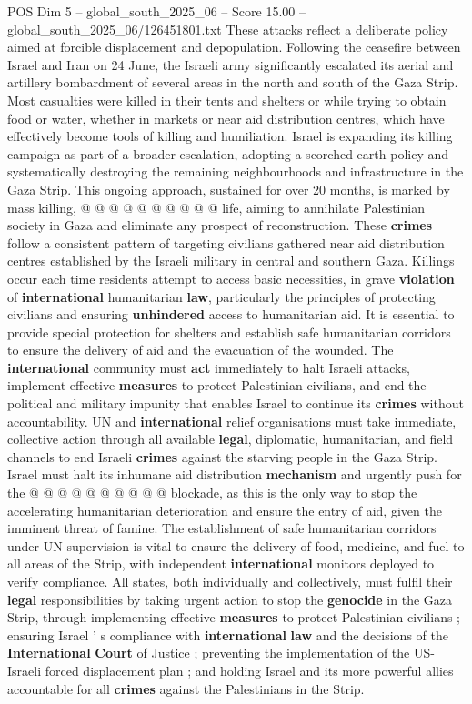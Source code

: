 \begin{textsample}{POS Dim 5 – global\_south\_2025\_06 – Score 15.00 – global\_south\_2025\_06/126451801.txt}
These attacks reflect a deliberate policy aimed at forcible displacement and depopulation.
Following the ceasefire between Israel and Iran on 24 June, the Israeli army significantly escalated its aerial and artillery bombardment of several areas in the north and south of the Gaza Strip.
Most casualties were killed in their tents and shelters or while trying to obtain food or water, whether in markets or near aid distribution centres, which have effectively become tools of killing and humiliation.
Israel is expanding its killing campaign as part of a broader escalation, adopting a scorched-earth policy and systematically destroying the remaining neighbourhoods and infrastructure in the Gaza Strip.
This ongoing approach, sustained for over 20 months, is marked by mass killing, @ @ @ @ @ @ @ @ @ @ life, aiming to annihilate Palestinian society in Gaza and eliminate any prospect of reconstruction.
These \textbf{crimes} follow a consistent pattern of targeting civilians gathered near aid distribution centres established by the Israeli military in central and southern Gaza.
Killings occur each time residents attempt to access basic necessities, in grave \textbf{violation} of \textbf{international} humanitarian \textbf{law}, particularly the principles of protecting civilians and ensuring \textbf{unhindered} access to humanitarian aid.
It is essential to provide special protection for shelters and establish safe humanitarian corridors to ensure the delivery of aid and the evacuation of the wounded.
The \textbf{international} community must \textbf{act} immediately to halt Israeli attacks, implement effective \textbf{measures} to protect Palestinian civilians, and end the political and military impunity that enables Israel to continue its \textbf{crimes} without accountability.
UN and \textbf{international} relief organisations must take immediate, collective action through all available \textbf{legal}, diplomatic, humanitarian, and field channels to end Israeli \textbf{crimes} against the starving people in the Gaza Strip.
Israel must halt its inhumane aid distribution \textbf{mechanism} and urgently push for the @ @ @ @ @ @ @ @ @ @ blockade, as this is the only way to stop the accelerating humanitarian deterioration and ensure the entry of aid, given the imminent threat of famine.
The establishment of safe humanitarian corridors under UN supervision is vital to ensure the delivery of food, medicine, and fuel to all areas of the Strip, with independent \textbf{international} monitors deployed to verify compliance.
All states, both individually and collectively, must fulfil their \textbf{legal} responsibilities by taking urgent action to stop the \textbf{genocide} in the Gaza Strip, through implementing effective \textbf{measures} to protect Palestinian civilians ; ensuring Israel ' s compliance with \textbf{international} \textbf{law} and the decisions of the \textbf{International} \textbf{Court} of Justice ; preventing the implementation of the US-Israeli forced displacement plan ; and holding Israel and its more powerful allies accountable for all \textbf{crimes} against the Palestinians in the Strip.

\end{textsample}
